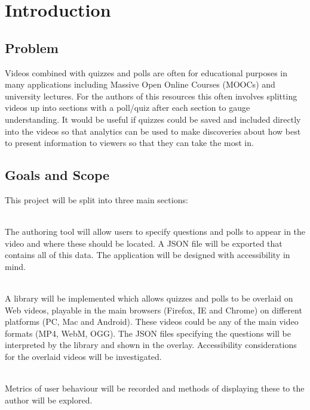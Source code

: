 \chapter{Introduction} \label{Chapter:Introduction}
\section{Problem} \label{Section:Problem}
Videos combined with quizzes and polls are often for educational purposes in many applications including Massive Open Online Courses (MOOCs) and university lectures. For the authors of this resources this often involves splitting videos up into sections with a poll/quiz after each section to gauge understanding. It would be useful if quizzes could be saved and included directly into the videos so that analytics can be used to make discoveries about how best to present information to viewers so that they can take the most in.

\section{Goals and Scope} \label{Section:Goals and Scope}
This project will be split into three main sections:
\begin{description}[%
  before={\setcounter{descriptcount}{0}},%
  ,font=\bfseries\stepcounter{descriptcount}\thedescriptcount~]
\item[Quiz Authoring Tool] \hfill \\
The authoring tool will allow users to specify questions and polls to appear in the video and where these should be located. A JSON file will be exported that contains all of this data. The application will be designed with accessibility in mind.
\item[Overlaid Video Player] \hfill \\
A library will be implemented which allows quizzes and polls to be overlaid on Web videos, playable in the main browsers (Firefox, IE and Chrome) on different platforms (PC, Mac and Android). These videos could be any of the main video formats (MP4, WebM, OGG). The JSON files specifying the questions will be interpreted by the library and shown in the overlay. Accessibility considerations for the overlaid videos will be investigated.
\item[Video and Quiz Analytics] \hfill \\
Metrics of user behaviour will be recorded and methods of displaying these to the author will be explored.
\end{description}